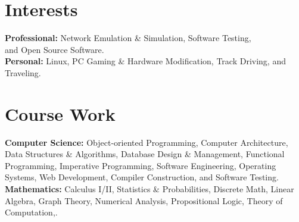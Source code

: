 \documentclass[print]{friggeri-cv} %
\begin{document}

\section{Interests}

\textbf{Professional:} Network Emulation \& Simulation, Software Testing, \\and Open Source
Software.\\
\textbf{Personal:} Linux, PC Gaming \& Hardware Modification, Track Driving, and Traveling.


\section{Course Work}

\textbf{Computer Science:}
Object-oriented Programming, Computer Architecture, \\Data Structures \& Algorithms, Database
Design \& Management, Functional Programming, Imperative Programming, Software Engineering,
Operating Systems, Web Development, Compiler Construction, and Software Testing. \\
\textbf{Mathematics:}
Calculus I/II, Statistics \& Probabilities, Discrete Math, Linear Algebra, Graph Theory, Numerical Analysis,
Propositional Logic, Theory of Computation,.

\end{document}
